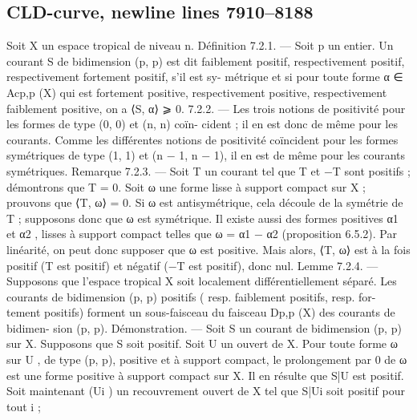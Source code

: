 \documentclass[
  10pt,
]{article}
\newenvironment{Shaded}{}{}
\newcommand{\NormalTok}[1]{#1}
\begin{document}
\subsection{CLD-curve, newline lines
7910--8188}\label{cld-curve-newline-lines-79108188}

\begin{Shaded}
\begin{Highlighting}[]

\NormalTok{  Soit X un espace tropical de niveau n.}
\NormalTok{Définition 7.2.1. — Soit p un entier. Un courant S de bidimension (p, p) est dit}
\NormalTok{faiblement positif, respectivement positif, respectivement fortement positif, s’il est sy{-}}
\NormalTok{métrique et si pour toute forme α ∈ Acp,p (X) qui est fortement positive, respectivement}
\NormalTok{positive, respectivement faiblement positive, on a ⟨S, α⟩ ⩾ 0.}
\NormalTok{7.2.2. — Les trois notions de positivité pour les formes de type (0, 0) et (n, n) coïn{-}}
\NormalTok{cident ; il en est donc de même pour les courants. Comme les différentes notions de}
\NormalTok{positivité coïncident pour les formes symétriques de type (1, 1) et (n − 1, n − 1), il en}
\NormalTok{est de même pour les courants symétriques.}
\NormalTok{Remarque 7.2.3. — Soit T un courant tel que T et −T sont positifs ; démontrons}
\NormalTok{que T = 0. Soit ω une forme lisse à support compact sur X ; prouvons que ⟨T, ω⟩ = 0.}
\NormalTok{Si ω est antisymétrique, cela découle de la symétrie de T ; supposons donc que ω est}
\NormalTok{symétrique. Il existe aussi des formes positives α1 et α2 , lisses à support compact telles}
\NormalTok{que ω = α1 − α2 (proposition 6.5.2). Par linéarité, on peut donc supposer que ω est}
\NormalTok{positive. Mais alors, ⟨T, ω⟩ est à la fois positif (T est positif) et négatif (−T est positif),}
\NormalTok{donc nul.}
\NormalTok{Lemme 7.2.4. — Supposons que l’espace tropical X soit localement différentiellement}
\NormalTok{séparé. Les courants de bidimension (p, p) positifs ( resp. faiblement positifs, resp. for{-}}
\NormalTok{tement positifs) forment un sous{-}faisceau du faisceau Dp,p (X) des courants de bidimen{-}}
\NormalTok{sion (p, p).}
\NormalTok{Démonstration. — Soit S un courant de bidimension (p, p) sur X.}
\NormalTok{   Supposons que S soit positif. Soit U un ouvert de X. Pour toute forme ω sur U , de}
\NormalTok{type (p, p), positive et à support compact, le prolongement par 0 de ω est une forme}
\NormalTok{positive à support compact sur X. Il en résulte que S|U est positif.}
\NormalTok{   Soit maintenant (Ui ) un recouvrement ouvert de X tel que S|Ui soit positif pour tout i ;}

\end{Highlighting}
\end{Shaded}
\end{document}
